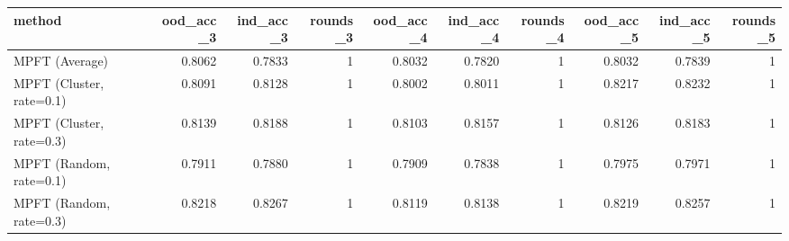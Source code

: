 \begin{tabular}{lrrrrrrrrr}
\toprule
method & ood_acc_3 & ind_acc_3 & rounds_3 & ood_acc_4 & ind_acc_4 & rounds_4 & ood_acc_5 & ind_acc_5 & rounds_5 \\
\midrule
MPFT (Average) & 0.8062 & 0.7833 & 1 & 0.8032 & 0.7820 & 1 & 0.8032 & 0.7839 & 1 \\
MPFT (Cluster, rate=0.1) & 0.8091 & 0.8128 & 1 & 0.8002 & 0.8011 & 1 & 0.8217 & 0.8232 & 1 \\
MPFT (Cluster, rate=0.3) & 0.8139 & 0.8188 & 1 & 0.8103 & 0.8157 & 1 & 0.8126 & 0.8183 & 1 \\
MPFT (Random, rate=0.1) & 0.7911 & 0.7880 & 1 & 0.7909 & 0.7838 & 1 & 0.7975 & 0.7971 & 1 \\
MPFT (Random, rate=0.3) & 0.8218 & 0.8267 & 1 & 0.8119 & 0.8138 & 1 & 0.8219 & 0.8257 & 1 \\
\bottomrule
\end{tabular}
